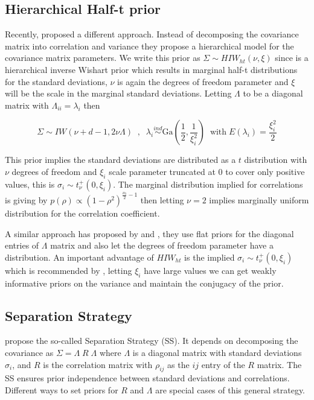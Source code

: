 \documentclass[a4paper]{article}
\begin{document}
\subsection{Hierarchical Half-t prior}

Recently, \cite{huang2013simple} proposed a different approach. Instead of decomposing the covariance matrix into correlation and variance they propose a hierarchical model for the covariance matrix parameters. We write this prior as $\Sigma \sim HIW_{ht}(\nu, \xi)$ since is a hierarchical inverse Wishart prior which results in marginal half-t distributions for the standard deviations, $\nu$ is again the degrees of freedom parameter and $\xi$ will be the scale in the marginal standard deviations.   Letting  $\Lambda$ to be a diagonal matrix with $\Lambda_{ii} =\lambda_i $ then

\begin{equation}
\Sigma \sim IW( \nu + d - 1 ,  2\nu\Lambda) \;\;,\;\;  \lambda_i  \stackrel{ind} \sim \mbox{Ga}\left(\frac{1}{2} , \frac{1}{\xi_i^2}\right) \;\; \mbox{with} \; E(\lambda_i)=\frac{\xi_i^2}{2} 
\label{eq:ht}
\end{equation} 

This prior implies the standard deviations are distributed as a $t$ distribution with $\nu$ degrees of freedom and $\xi_i$ scale parameter truncated at 0 to cover only positive values, this is $\sigma_i \sim t_{\nu}^{+}(0, \xi_i)$.  The marginal distribution implied for correlations is giving by $p(\rho) \propto (1-\rho^2)^{\frac{\nu_0}{2}-1}$ then letting $\nu=2$ implies marginally uniform distribution for the correlation coefficient. 

A similar approach has proposed by \cite{daniels1999} and \cite{matilde}, they use flat priors for the diagonal entries of $\Lambda$ matrix and also let the degrees of freedom parameter have a distribution.  An important advantage of  $HIW_{ht}$ is the implied $\sigma_i \sim t_{\nu}^{+}(0, \xi_i)$ which is recommended by \cite{gelman2006prior}, letting $\xi_i$ have large values we can get weakly informative priors on the variance and maintain the conjugacy of the prior.  

\subsection{Separation Strategy \label{ss.sec} }

\cite{barnard2000} propose the so-called Separation Strategy (SS). It depends on decomposing the covariance as $\Sigma = \Lambda \; R \; \Lambda$  where $\Lambda$ is a diagonal matrix with  standard deviations $\sigma_{i}$, and $R$ is the correlation matrix with $\rho_{ij}$  as the $ij$ entry of the $R$ matrix. The SS ensures prior independence between standard deviations and correlations.  Different ways to set priors for $R$ and $\Lambda$ are special cases of this general strategy. 
\end{document}
